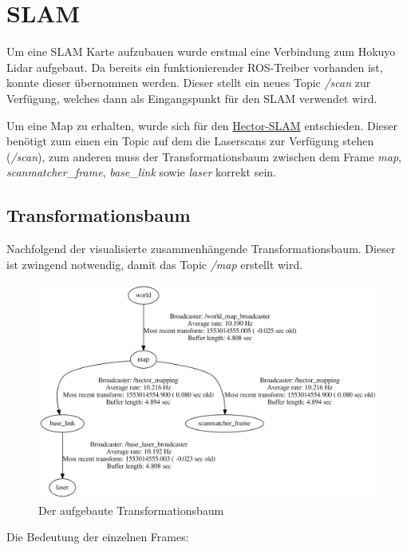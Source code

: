 \section{SLAM}

Um eine SLAM Karte aufzubauen wurde erstmal eine Verbindung zum Hokuyo Lidar aufgebaut. Da bereits ein funktionierender ROS-Treiber vorhanden ist, konnte dieser übernommen werden. Dieser stellt ein neues Topic \textit{/scan} zur Verfügung, welches dann als Eingangspunkt für den SLAM verwendet wird. 

Um eine Map zu erhalten, wurde sich für den \href{http://wiki.ros.org/hector_mapping}{Hector-SLAM} entschieden. Dieser benötigt zum einen ein Topic auf dem die Laserscans zur Verfügung stehen (\textit{/scan}), zum anderen muss der Transformationsbaum zwischen dem Frame \textit{map}, \textit{scanmatcher\_frame}, \textit{base\_link} sowie \textit{laser} korrekt sein.  




\subsection{Transformationsbaum}

Nachfolgend der visualisierte zusammenhängende Transformationsbaum. Dieser ist zwingend notwendig, damit das Topic \textit{/map} erstellt wird. 


\begin{figure}[hbtp]
\centering
\includegraphics[scale=0.15]{images/chapter5/tf_alf.png}
\caption{Der aufgebaute Transformationsbaum}
\label{fig:tf_alf}
\end{figure}


Die Bedeutung der einzelnen Frames:

